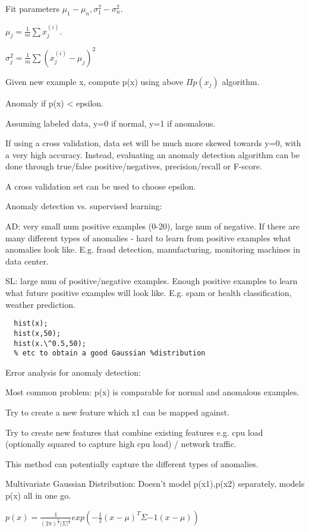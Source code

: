 \documentclass[12pt] {article}
\begin{document}
{  Fit parameters $\mu_1-\mu_n, \sigma_1^2-\sigma_n^2$. 
  
  $\mu_j = \frac{1}{m} \sum x_j^{(i)}$.
  
  $\sigma^2_j = \frac{1}{m} \sum (x_j^{(i)} - \mu_j)^2$

  Given new example x, compute p(x) using above $\Pi p(x_j)$ algorithm.

  Anomaly if p(x) < epsilon. 

  Assuming labeled data, y=0 if normal, y=1 if anomalous.

  If using a cross validation, data set will be much more skewed towards
  y=0, with a very high accuracy. Instead, evaluating an anomaly detection
  algorithm can be done through true/false positive/negatives, 
  precision/recall or F-score. 
  
  A cross validation set can be used to choose epsilon.  

  Anomaly detection vs. supervised learning:

  AD: very small num positive examples (0-20), large num of negative. If there 
  are many different types of anomalies - hard to learn from positive examples 
  what anomalies look like. E.g. fraud detection, manufacturing, monitoring 
  machines in data center. 
  
  SL: large num of positive/negative examples. Enough positive examples to 
  learn what future positive examples will look like. E.g. spam or health
  classification, weather prediction.

  \begin{lstlisting}
  hist(x); 
  hist(x,50); 
  hist(x.\^0.5,50); 
  % etc to obtain a good Gaussian %distribution
  \end{lstlisting}

  Error analysis for anomaly detection:

  Most common problem: p(x) is comparable for normal and anomalous examples.
  
  Try to create a new feature which x1 can be mapped against. 

  Try to create new features that combine existing features e.g. cpu load
  (optionally squared to capture high cpu load) / network traffic.
  
  This method can potentially capture the different types of anomalies. 
  
  Multivariate Gaussian Distribution: Doesn't model p(x1),p(x2) separately,
  models p(x) all in one go. 

  $p(x) = \frac{1}{(2\pi)^{\frac{n}{2}}|\Sigma|^{\frac{1}{2}}} 
  exp(-\frac{1}{2}(x-\mu)^T\Sigma{-1}(x-\mu))$
  
}
\end{document}
